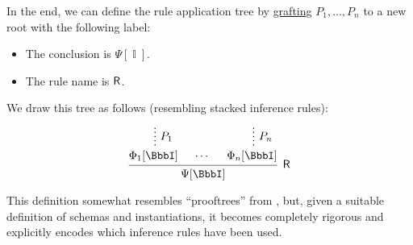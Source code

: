 \begin{concept}
\begin{thmenum}[resume=con:proof_tree]
    In the end, we can define the rule application tree by \hyperref[def:ordered_tree_grafting_product]{grafting} \( P_1, \ldots, P_n \) to a new root with the following label:
    \begin{itemize}
      \item The conclusion is \( \Psi[\BbbI] \).
      \item The rule name is \( \textsf{\upshape R} \).
    \end{itemize}

    We draw this tree as follows (resembling stacked inference rules):
    \begin{equation*}
      \begin{prooftree}
        \hypo{}
        \ellipsis { \( P_1 \) } { \Phi_1[\BbbI] }

        \hypo{ \cdots }

        \hypo{}
        \ellipsis { \( P_n \) } { \Phi_n[\BbbI] }
        \infer3[\logic{R}]{ \Psi[\BbbI] }
      \end{prooftree}
    \end{equation*}
  \end{thmenum}
\end{concept}
\begin{comments}
  \item This definition somewhat resembles \enquote{prooftrees} from , but, given a suitable definition of schemas and instantiations, it becomes completely rigorous and explicitly encodes which inference rules have been used.
\end{comments}

